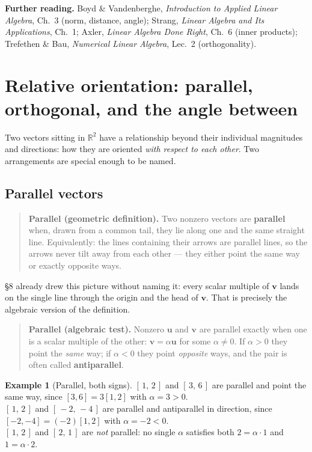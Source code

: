 \documentclass[11pt]{article}
\theoremstyle{definition}
\newtheorem{ex}{Example}[section]
\theoremstyle{remark}
\newcommand{\R}{\mathbb{R}}
\newcommand{\vc}[1]{\mathbf{#1}}
\begin{document}
\medskip
\noindent\textbf{Further reading.}
Boyd \& Vandenberghe, \emph{Introduction to Applied Linear Algebra}, Ch.~3
(norm, distance, angle);
Strang, \emph{Linear Algebra and Its Applications}, Ch.~1;
Axler, \emph{Linear Algebra Done Right}, Ch.~6 (inner products);
Trefethen \& Bau, \emph{Numerical Linear Algebra}, Lec.~2 (orthogonality).

\section{Relative orientation: parallel, orthogonal, and the angle between}
Two vectors sitting in $\R^{2}$ have a relationship beyond their individual
magnitudes and directions: how they are oriented \emph{with respect to each
other}. Two arrangements are special enough to be named.

\subsection{Parallel vectors}
\begin{quote}
\textbf{Parallel (geometric definition).} Two nonzero vectors are
\textbf{parallel} when, drawn from a common tail, they lie along one and the
same straight line. Equivalently: the lines containing their arrows are parallel
lines, so the arrows never tilt away from each other --- they either point the
same way or exactly opposite ways.
\end{quote}

\noindent \S8 already drew this picture without naming it: every scalar multiple
of $\vc{v}$ lands on the single line through the origin and the head of
$\vc{v}$. That is precisely the algebraic version of the definition.

\begin{quote}
\textbf{Parallel (algebraic test).} Nonzero $\vc{u}$ and $\vc{v}$ are parallel
exactly when one is a scalar multiple of the other: $\vc{v}=\alpha\vc{u}$ for
some $\alpha\neq0$. If $\alpha>0$ they point the \emph{same} way; if $\alpha<0$
they point \emph{opposite} ways, and the pair is often called
\textbf{antiparallel}.
\end{quote}

\begin{ex}[Parallel, both signs]
$[\,1,\,2\,]$ and $[\,3,\,6\,]$ are parallel and point the same way, since
$[3,6]=3[1,2]$ with $\alpha=3>0$. \\
$[\,1,\,2\,]$ and $[\,-2,\,-4\,]$ are parallel and antiparallel in direction,
since $[-2,-4]=(-2)[1,2]$ with $\alpha=-2<0$. \\
$[\,1,\,2\,]$ and $[\,2,\,1\,]$ are \emph{not} parallel: no single $\alpha$
satisfies both $2=\alpha\cdot1$ and $1=\alpha\cdot2$.
\end{ex}
\end{document}
